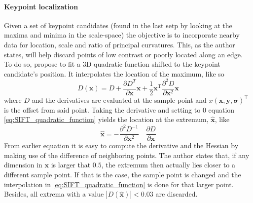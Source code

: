 \documentclass[../main.tex]{subfiles}
\begin{document}
\paragraph{Keypoint localization}
Given a set of keypoint candidates (found in the last setp by looking at the maxima and minima in the scale-space) the objective is to incorporate nearby data for location, scale and ratio of principal curvatures. This, as the author states, will help discard points of low contrast or poorly located along an edge. To do so, \cite{SIFT_Brown_Lowe} propose to fit a 3D quadratic function shifted to the keypoint candidate's position. It interpolates the location of the maximum, like so
\begin{equation} \label{eq:SIFT_quadratic_function}
    D(\mathbf{x})=D+\frac{\partial D^{T}}{\partial \mathbf{x}} \mathbf{x}+\frac{1}{2} \mathbf{x}^{\mathrm{T}} \frac{\partial^{2} D}{\partial \mathbf{x}^{2}} \mathbf{x}
\end{equation}
where $D$ and the derivatives are evaluated at the sample point and $x\left(\mathbf{x}, \mathbf{y}, \mathbf{\sigma}\right)^{\top}$ is the offset from said point. Taking the derivative and setting to 0 equation \ref{eq:SIFT_quadratic_function} yields the location at the extremum, $\hat{\mathbf{x}}$, like
\begin{equation} \label{eq:SIFT_quadratic_function_extremum}
    \hat{\mathbf{x}}=-\frac{\partial^{2} D^{-1}}{\partial \mathbf{x}^{2}} \quad \frac{\partial D}{\partial \mathbf{x}}
\end{equation}
From earlier equation it is easy to compute the derivative and the Hessian by making use of the difference of neighboring points. The author states that, if any dimension in $\mathbf{x}$ is larger that $0.5$, the extremum then actually lies closer to a different sample point. If that is the case, the sample point is changed and the interpolation in \ref{eq:SIFT_quadratic_function} is done for that larger point. Besides, all extrema with a value $|D(\hat{\mathbf{x}})| < 0.03$ are discarded.
\end{document}
